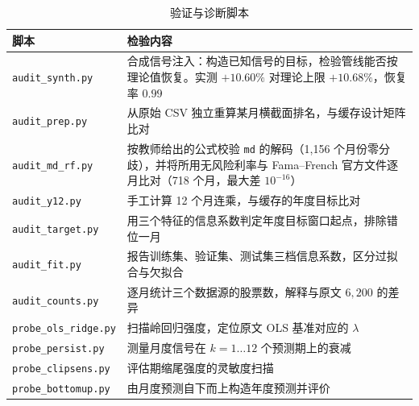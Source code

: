 \documentclass[11pt,a4paper,fontset=windows]{ctexart}
\newcommand{\code}[1]{\texttt{#1}}
\begin{document}
\begin{table}[htbp]
\centering
\caption{验证与诊断脚本}
\label{tab:auditscripts}
\small
\begin{tabular}{p{4.2cm}p{9.8cm}}
\toprule
脚本 & 检验内容 \\
\midrule
\code{audit\_synth.py} & 合成信号注入：构造已知信号的目标，检验管线能否按理论值恢复。实测 $+10.60\%$ 对理论上限 $+10.68\%$，恢复率 $0.99$ \\
\code{audit\_prep.py} & 从原始 CSV 独立重算某月横截面排名，与缓存设计矩阵比对 \\
\code{audit\_md\_rf.py} & 按教师给出的公式校验 \code{md} 的解码（1{,}156 个月份零分歧），并将所用无风险利率与 Fama--French 官方文件逐月比对（718 个月，最大差 $10^{-16}$） \\
\code{audit\_y12.py} & 手工计算 12 个月连乘，与缓存的年度目标比对 \\
\code{audit\_target.py} & 用三个特征的信息系数判定年度目标窗口起点，排除错位一月 \\
\code{audit\_fit.py} & 报告训练集、验证集、测试集三档信息系数，区分过拟合与欠拟合 \\
\code{audit\_counts.py} & 逐月统计三个数据源的股票数，解释与原文 $6{,}200$ 的差异 \\
\code{probe\_ols\_ridge.py} & 扫描岭回归强度，定位原文 OLS 基准对应的 $\lambda$ \\
\code{probe\_persist.py} & 测量月度信号在 $k=1\ldots12$ 个预测期上的衰减 \\
\code{probe\_clipsens.py} & 评估期缩尾强度的灵敏度扫描 \\
\code{probe\_bottomup.py} & 由月度预测自下而上构造年度预测并评价 \\
\bottomrule
\end{tabular}
\end{table}
\end{document}
